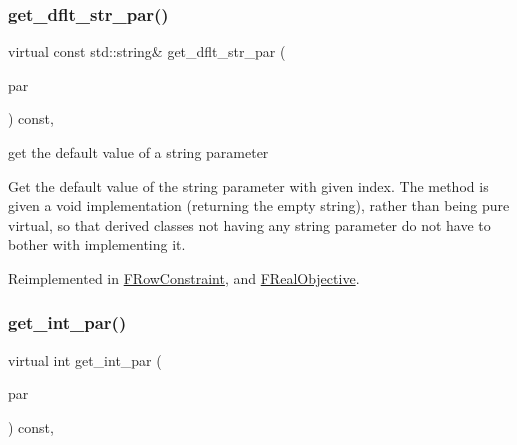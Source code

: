 \subsubsection{\texorpdfstring{get\+\_\+dflt\+\_\+str\+\_\+par()}{get\_dflt\_str\_par()}}
{\footnotesize\ttfamily virtual const std\+::string\& get\+\_\+dflt\+\_\+str\+\_\+par (\begin{DoxyParamCaption}\item[{const \mbox{\hyperlink{class_s_m_spp__di__unipi__it_1_1_thin_compute_interface_aa3d710629ad8c434286726ad810c3b47}{idx\+\_\+type}}}]{par }\end{DoxyParamCaption}) const\hspace{0.3cm}{\ttfamily [inline]}, {\ttfamily [virtual]}}



get the default value of a string parameter 

Get the default value of the string parameter with given index. The method is given a void implementation (returning the empty string), rather than being pure virtual, so that derived classes not having any string parameter do not have to bother with implementing it. 

Reimplemented in \mbox{\hyperlink{class_s_m_spp__di__unipi__it_1_1_f_row_constraint_a4d332ec2a836a87b0bd3b3539752e89f}{F\+Row\+Constraint}}, and \mbox{\hyperlink{class_s_m_spp__di__unipi__it_1_1_f_real_objective_a4d332ec2a836a87b0bd3b3539752e89f}{F\+Real\+Objective}}.

\mbox{\label{class_s_m_spp__di__unipi__it_1_1_thin_compute_interface_a9403da6fd83a275dfdf21ec4db71c744}} 
\subsubsection{\texorpdfstring{get\+\_\+int\+\_\+par()}{get\_int\_par()}}
{\footnotesize\ttfamily virtual int get\+\_\+int\+\_\+par (\begin{DoxyParamCaption}\item[{const \mbox{\hyperlink{class_s_m_spp__di__unipi__it_1_1_thin_compute_interface_aa3d710629ad8c434286726ad810c3b47}{idx\+\_\+type}}}]{par }\end{DoxyParamCaption}) const\hspace{0.3cm}{\ttfamily [inline]}, {\ttfamily [virtual]}}



